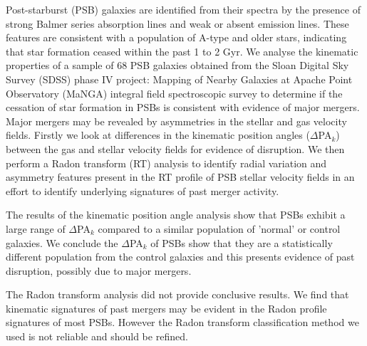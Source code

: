 
Post-starburst (PSB) galaxies are identified from their spectra by the presence of strong Balmer series absorption lines and weak or absent emission lines. These features are consistent with a population of A-type and older stars, indicating that star formation ceased within the past 1 to 2 Gyr. We analyse the kinematic properties of a sample of 68 PSB galaxies obtained from the Sloan Digital Sky Survey (SDSS) phase IV project: Mapping of Nearby Galaxies at Apache Point Observatory (MaNGA) integral field spectroscopic survey to determine if the cessation of star formation in PSBs is consistent with evidence of major mergers. Major mergers may be revealed by asymmetries in the stellar and gas velocity fields. Firstly we look at differences in the kinematic position angles ($\Delta$PA$_{k}$) between the gas and stellar velocity fields for evidence of disruption. We then perform a Radon transform (RT) analysis to identify radial variation and asymmetry features present in the RT profile of PSB stellar velocity fields in an effort to identify underlying signatures of past merger activity.

The results of the kinematic position angle analysis show that PSBs exhibit a large range of $\Delta$PA$_{k}$ compared to a similar population of 'normal' or control galaxies. We conclude the $\Delta$PA$_{k}$ of PSBs show that they are a statistically different population from the control galaxies and this presents evidence of past disruption, possibly due to major mergers. 

The Radon transform analysis did not provide conclusive results. We find that kinematic signatures of past mergers may be evident in the Radon profile signatures of most PSBs. However the Radon transform classification method we used is not reliable and should be refined.